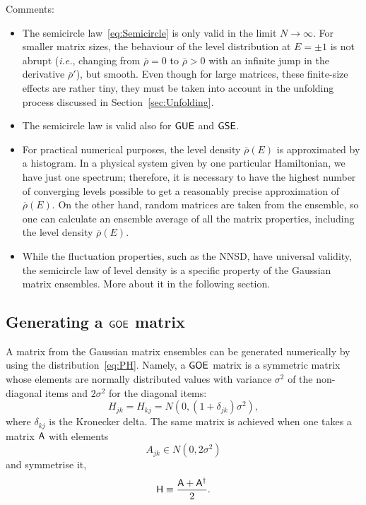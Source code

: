 \documentclass[a4paper,11pt,twoside]{article}
\begin{document}
        Comments:
        \begin{itemize}
            \item 
                The semicircle law~\eqref{eq:Semicircle} is only valid in the limit $N\rightarrow\infty$.
                For smaller matrix sizes, the behaviour of the level distribution at $E=\pm1$ is not abrupt (\emph{i.e.}, changing from $\overline{\rho}=0$ to $\overline{\rho}>0$ with an infinite jump in the derivative $\overline{\rho}'$), but smooth.
                Even though for large matrices, these finite-size effects are rather tiny, they must be taken into account in the unfolding process discussed in Section~\ref{sec:Unfolding}.

            \item The semicircle law is valid also for $\mathsf{GUE}$ and $\mathsf{GSE}$. 
        
            \item 
                For practical numerical purposes, the level density $\overline{\rho}(E)$ is approximated by a histogram.
                In a physical system given by one particular Hamiltonian, we have just one spectrum; therefore, it is necessary to have the highest number of converging levels possible to get a reasonably precise approximation of $\overline{\rho}(E)$.
                On the other hand, random matrices are taken from the ensemble, so one can calculate an ensemble average of all the matrix properties, including the level density $\overline{\rho}(E)$.
                
            \item 
                While the fluctuation properties, such as the NNSD, have universal validity, the semicircle law of level density is a specific property of the Gaussian matrix ensembles.
                More about it in the following section.
        \end{itemize}

    \subsection{Generating a $\mathsf{GOE}$ matrix}
        A matrix from the Gaussian matrix ensembles can be generated numerically by using the distribution~\eqref{eq:PH}.
        Namely, a $\mathsf{GOE}$ matrix is a symmetric matrix whose elements are normally distributed values with variance $\sigma^{2}$ of the non-diagonal items and $2\sigma^{2}$ for the diagonal items:
        \begin{equation}
            H_{jk}=H_{kj}=N\left(0,(1+\delta_{jk})\sigma^{2}\right),
        \end{equation}
        where $\delta_{kj}$ is the Kronecker delta. 
        The same matrix is achieved when one takes a matrix $\mathsf{A}$ with elements
        \begin{equation}
            A_{jk}\in N(0,2\sigma^{2})
        \end{equation}
        and symmetrise it,
        \begin{equation}
            \mathsf{H}\equiv\frac{\mathsf{A}+\mathsf{A}^{\dagger}}{2}.
        \end{equation}
\end{document}

